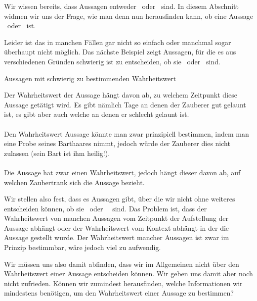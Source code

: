 \documentclass[../../main.tex]{subfiles}
\begin{document}
Wir wissen bereits, dass Aussagen entweder \wahr\  oder \falsch\  sind.
In diesem Abschnitt widmen wir uns der Frage, wie man denn nun herausfinden kann, 
ob eine Aussage \wahr\  oder \falsch\  ist. 

Leider ist das in manchen Fällen gar nicht so einfach oder manchmal sogar 
überhaupt nicht möglich. Das nächste Beispiel zeigt Aussagen, für die es aus verschiedenen Gründen schwierig ist zu entscheiden, ob sie \wahr\  oder \falsch\  sind.

\begin{example}{Aussagen mit schwierig zu bestimmenden Wahrheitswert}

    Der Wahrheitswert der Aussage  hängt davon ab, zu welchem Zeitpunkt diese Aussage getätigt wird. Es gibt nämlich Tage an denen der Zauberer gut gelaunt ist, es gibt aber auch welche an denen er schlecht gelaunt ist.
    \\ \\
    Den Wahrheitswert Aussage  könnte man zwar prinzipiell bestimmen, indem man eine Probe seines Barthaares nimmt, jedoch würde der Zauberer dies nicht zulassen (sein Bart ist ihm heilig!).
    \\ \\
    Die Aussage  hat zwar einen Wahrheitswert, jedoch hängt dieser davon ab, auf welchen Zaubertrank sich die Aussage bezieht.
\end{example}

Wir stellen also fest, dass es Aussagen gibt, über die wir nicht ohne weiteres entscheiden können, ob sie \wahr\  oder \falsch\ \  sind. Das Problem ist, dass der Wahrheitswert von manchen Aussagen vom Zeitpunkt der Aufstellung der Aussage abhängt oder der Wahrheitswert vom Kontext abhängt in der die Aussage gestellt wurde. Der Wahrheitswert mancher Aussagen ist zwar im Prinzip bestimmbar, wäre jedoch viel zu aufwendig.

Wir müssen uns also damit abfinden, dass wir im Allgemeinen nicht über den Wahrheitswert einer Aussage entscheiden können. Wir geben uns damit aber noch nicht zufrieden. Können wir zumindest herausfinden, welche Informationen wir mindestens benötigen, um den Wahrheitswert einer Aussage zu bestimmen?
\end{document}
